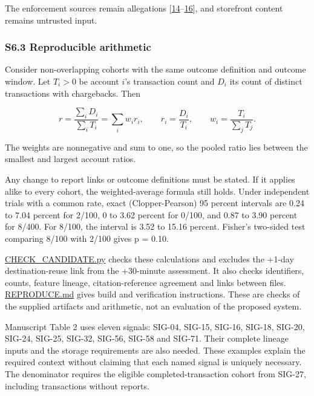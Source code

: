 \documentclass[
  11pt,
]{article}
\begin{document}
The enforcement sources remain allegations
{[}\protect\hyperlink{ref-FTC2020FirstData}{14}--\protect\hyperlink{ref-FTC2019Allied}{16}{]},
and storefront content remains untrusted input.

\hypertarget{s6.3-reproducible-arithmetic}{%
\subsubsection{S6.3 Reproducible
arithmetic}\label{s6.3-reproducible-arithmetic}}

Consider non-overlapping cohorts with the same outcome definition and
outcome window. Let \(T_i > 0\) be account \(i\)'s transaction count and
\(D_i\) its count of distinct transactions with chargebacks. Then

\[
r = \frac{\sum_i D_i}{\sum_i T_i} = \sum_i w_i r_i,
\qquad r_i = \frac{D_i}{T_i},
\qquad w_i = \frac{T_i}{\sum_j T_j}.
\]

The weights are nonnegative and sum to one, so the pooled ratio lies
between the smallest and largest account ratios.

Any change to report links or outcome definitions must be stated. If it
applies alike to every cohort, the weighted-average formula still holds.
Under independent trials with a common rate, exact (Clopper-Pearson) 95
percent intervals are 0.24 to 7.04 percent for 2/100, 0 to 3.62 percent
for 0/100, and 0.87 to 3.90 percent for 8/400. For 8/100, the interval
is 3.52 to 15.16 percent. Fisher's two-sided test comparing 8/100 with
2/100 gives p = 0.10.

\url{CHECK_CANDIDATE.py} checks these calculations and excludes the
+1-day destination-reuse link from the +30-minute assessment. It also
checks identifiers, counts, feature lineage, citation-reference
agreement and links between files. \url{REPRODUCE.md} gives build and
verification instructions. These are checks of the supplied artifacts
and arithmetic, not an evaluation of the proposed system.

Manuscript Table 2 uses eleven signals: \mbox{SIG-04}, \mbox{SIG-15},
\mbox{SIG-16}, \mbox{SIG-18}, \mbox{SIG-20}, \mbox{SIG-24},
\mbox{SIG-25}, \mbox{SIG-32}, \mbox{SIG-56}, \mbox{SIG-58} and
\mbox{SIG-71}. Their complete lineage inputs and the storage
requirements are also needed. These examples explain the required
context without claiming that each named signal is uniquely necessary.
The denominator requires the eligible completed-transaction cohort from
\mbox{SIG-27}, including transactions without reports.
\end{document}
